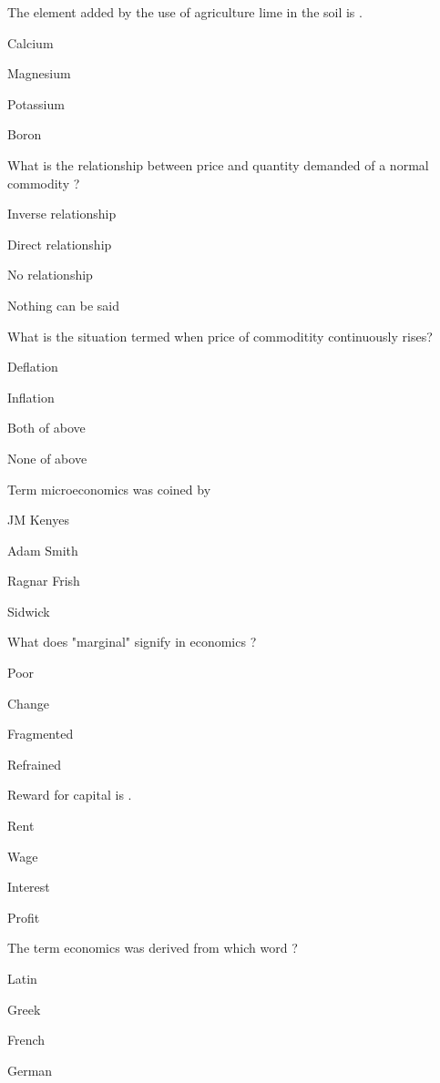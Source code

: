 \begin{questions}
\question The element added by the use of agriculture lime in the soil is \fillin[][3cm].
\begin{items}
\item* Calcium
\item Magnesium
\item Potassium
\item Boron
\end{items}

\question What is the relationship between price and quantity demanded of a normal commodity ?
\begin{items}
\item* Inverse relationship
\item Direct relationship
\item No relationship
\item Nothing can be said
\end{items}

\question What is the situation termed when price of commoditity continuously rises?
\begin{items}
\item Deflation
\item* Inflation
\item Both of above
\item None of above
\end{items}

\question Term microeconomics was coined by
\begin{items}
\item JM Kenyes
\item Adam Smith
\item* Ragnar Frish
\item Sidwick
\end{items}

\question What does "marginal" signify in economics ?
\begin{items}
\item Poor
\item* Change
\item Fragmented
\item Refrained
\end{items}

\question Reward for capital is \fillin[][3cm].
\begin{items}
\item Rent
\item Wage
\item* Interest
\item Profit
\end{items}

\question The term economics was derived from which word ?
\begin{items}
\item Latin
\item* Greek
\item French
\item German
\end{items}

\end{questions}
